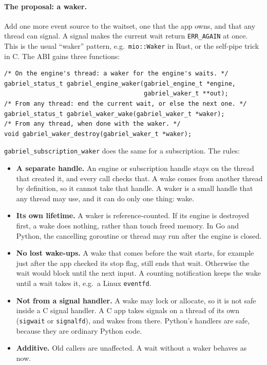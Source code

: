 \documentclass[11pt]{article}
\newcommand{\code}[1]{\texttt{#1}}
\begin{document}
\paragraph{The proposal: a waker.} Add one more event source to the waitset,
one that the app owns, and that any thread can signal. A signal makes the
current wait return \code{ERR\_AGAIN} at once. This is the usual ``waker''
pattern, e.g.\ \code{mio::Waker} in Rust, or the self-pipe trick in C. The ABI
gains three functions:
\begin{lstlisting}
/* On the engine's thread: a waker for the engine's waits. */
gabriel_status_t gabriel_engine_waker(gabriel_engine_t *engine,
                                      gabriel_waker_t **out);
/* From any thread: end the current wait, or else the next one. */
gabriel_status_t gabriel_waker_wake(gabriel_waker_t *waker);
/* From any thread, when done with the waker. */
void gabriel_waker_destroy(gabriel_waker_t *waker);
\end{lstlisting}
\code{gabriel\_subscription\_waker} does the same for a subscription. The
rules:
\begin{itemize}[nosep]
  \item \textbf{A separate handle.} An engine or subscription handle stays on
        the thread that created it, and every call checks that. A wake comes
        from another thread by definition, so it cannot take that handle. A
        waker is a small handle that any thread may use, and it can do only
        one thing: wake.
  \item \textbf{Its own lifetime.} A waker is reference-counted. If its
        engine is destroyed first, a wake does nothing, rather than touch
        freed memory. In Go and Python, the cancelling goroutine or thread may
        run after the engine is closed.
  \item \textbf{No lost wake-ups.} A wake that comes before the wait starts,
        for example just after the app checked its stop flag, still ends that
        wait. Otherwise the wait would block until the next input. A counting
        notification keeps the wake until a wait takes it, e.g.\ a Linux
        \code{eventfd}.
  \item \textbf{Not from a signal handler.} A wake may lock or allocate, so it
        is not safe inside a C signal handler. A C app takes signals on a
        thread of its own (\code{sigwait} or \code{signalfd}), and wakes from
        there. Python's handlers are safe, because they are ordinary Python
        code.
  \item \textbf{Additive.} Old callers are unaffected. A wait without a
        waker behaves as now.
\end{itemize}
\end{document}

